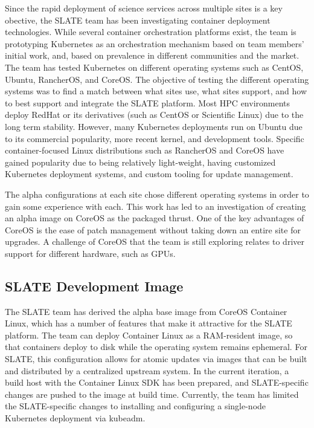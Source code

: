 \documentclass[sigconf]{acmart}
\begin{document}
Since the rapid deployment of science services across multiple sites is a key obective, the SLATE team has been investigating container deployment technologies. While several container orchestration platforms exist, the team is prototyping Kubernetes as an orchestration mechanism based on team members’ initial work, and, based on prevalence in different communities and the market.  
The team has tested Kubernetes on different operating systems such as CentOS, Ubuntu, RancherOS\cite{RancherOS}, and CoreOS\cite{CoreOS}.  The objective of testing the different operating systems was to find a match between what sites use, what sites support, and how to best support and integrate the SLATE platform.  Most HPC environments deploy RedHat or its derivatives (such as CentOS or Scientific Linux) due to the long term stability. However, many Kubernetes deployments run on Ubuntu due to its commercial popularity, more recent kernel, and development tools.  Specific container-focused Linux distributions such as RancherOS and CoreOS have gained popularity due to being relatively light-weight, having customized Kubernetes deployment systems, and custom tooling for update management. 

The alpha configurations at each site chose different operating systems in order to gain some experience with each.  This work has led to an investigation of creating an alpha image on CoreOS as the packaged thrust.  One of the key advantages of CoreOS is the ease of patch management without taking down an entire site for upgrades.  A challenge of CoreOS that the team is still exploring relates to driver support for different hardware, such as GPUs. 

\subsection{SLATE Development Image}

The SLATE team has derived the alpha base image from CoreOS Container Linux, which has a number of features that make it attractive for the SLATE platform. The team can deploy Container Linux as a RAM-resident image, so that containers deploy to disk while the operating system remains ephemeral. For SLATE, this configuration allows for atomic updates via images that can be built and distributed by a centralized upstream system. In the current iteration, a build host with the Container Linux SDK has been prepared, and SLATE-specific changes are pushed to the image at build time. Currently, the team has limited the SLATE-specific changes to installing and configuring a single-node Kubernetes deployment via kubeadm. 
\end{document}
